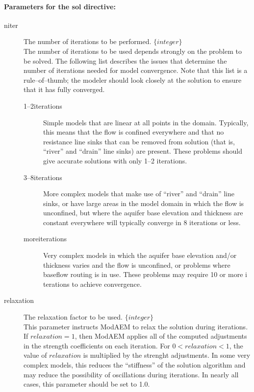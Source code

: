 \paragraph{Parameters for the sol directive:}
\begin{description}
  \item [{niter}] The number of iterations to be performed. $\{integer\}$\\
  The number of iterations to be used depends strongly on the problem
  to be solved. The following list describes the issues that determine
  the number of iterations needed for model convergence. Note that this
  list is a rule--of--thumb; the modeler should look closely at the solution
  to ensure that it has fully converged.
  \begin{description}
    \item [{1--2iterations}] Simple models that are linear at all points
      in the domain. Typically, this means that the flow is confined everywhere
      and that no resistance line sinks that can be removed from solution
      (that is, ``river'' and ``drain'' line sinks) are present. These
      problems should give accurate solutions with only 1--2 iterations.
    \item [{3--8iterations}] More complex models that make use of ``river''
      and ``drain'' line sinks, or have large areas in the model domain
      in which the flow is unconfined, but where the aquifer base elevation
      and thickness are constant everywhere will typically converge in 8
      iterations or less.
    \item [{moreiterations}] Very complex models in which the aquifer base
      elevation and/or thickness varies and the flow is unconfined, or problems
      where baseflow routing is in use. These problems may require 10 or more 
    i  terations to achieve convergence.
  \end{description}
  \item [{relaxation}] The relaxation factor to be used. $\{integer\}$\\
    This parameter instructs ModAEM to relax the solution during iterations.
    If $relaxation=1$, then ModAEM applies all of the computed adjustments
    in the strength coefficients on each iteration. For $0<relaxation<1$,
    the value of $relaxation$ is multiplied by the strenght adjustments.
    In some very complex models, this reduces the ``stiffness'' of the
    solution algorithm and may reduce the possibility of oscillations
    during iterations. In nearly all cases, this parameter should be set
    to 1.0.
\end{description}

